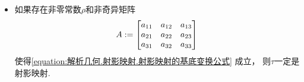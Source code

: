 \begin{theorem}
\begin{itemize}
	\item
	如果存在非零常数\(\rho\)和非奇异矩阵\begin{equation*}
		A
		:=
		\begin{bmatrix}
			a_{11} & a_{12} & a_{13} \\
			a_{21} & a_{22} & a_{23} \\
			a_{31} & a_{32} & a_{33}
		\end{bmatrix}
	\end{equation*}
	使得\cref{equation:解析几何.射影映射.射影映射的基底变换公式} 成立，
	则\(\tau\)一定是射影映射.
\end{itemize}
\end{theorem}
